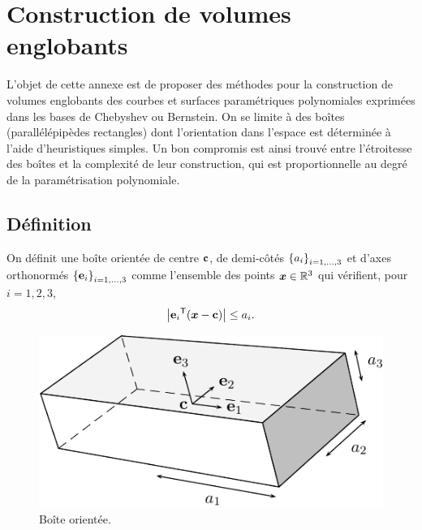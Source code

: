 \chapter{Construction de volumes englobants}%
\label{app:obb}

L'objet de cette annexe est de proposer des méthodes pour la construction de volumes englobants des courbes et surfaces paramétriques polynomiales exprimées dans les bases de Chebyshev ou Bernstein.
On se limite à des boîtes (parallélépipèdes rectangles) dont l'orientation dans l'espace est déterminée à l'aide d'heuristiques simples. Un bon compromis est ainsi trouvé entre l'étroitesse des boîtes et la complexité de leur construction, qui est proportionnelle au degré de la paramétrisation polynomiale.


\section{Définition}
On définit une boîte orientée de centre $\mathbf{c}$, de demi-côtés $\left\{{a}_{i}\right\}_{{i}={1},\ldots,{3}}$ et d'axes orthonormés $\left\{{\mathbf{e}}_{i}\right\}_{{i}={1},\ldots,{3}}$ comme l'ensemble des points $\boldsymbol{x} \in \mathbb{R}^3$ qui vérifient, pour $i=1,2,3$,
\begin{equation}
	\left| {\mathbf{e}_i} ^\mathsf{T} {\left(\boldsymbol{x} - \mathbf{c}\right)} \right| \leq a_i.
	\label{eq:def_obb}
\end{equation}

\begin{figure}
\centering
\includegraphics[scale=1]{figures/obb.pdf}
%
\caption{Boîte orientée.}
\end{figure}

